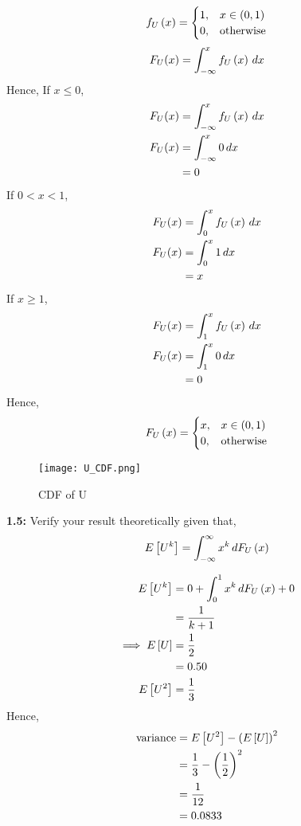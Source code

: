 \documentclass[journal,12pt,two column]{IEEEtran}
\begin{document}
\begin{align}  
f_{U}\left(x\right) = 
\begin{cases}
1, & x\in (0,1) \\
0, & \text{otherwise}
\end{cases}
\end{align}
\begin{equation}
    F_U(x) = \int_{-\infty}^{x} f_{U}\left(x\right) \,dx  \\
\end{equation}
Hence,
If $ x \leq 0 $,
\begin{align}
    F_U(x) &= \int_{-\infty}^{x} f_{U}\left(x\right) \,dx  \\
    F_U(x) &= \int_{-\infty}^{x} 0 \,dx  \\
           &= 0
\end{align}
If $0 <x <1$,
\begin{align}
    F_U(x) &= \int_{0}^{x} f_{U}\left(x\right) \,dx  \\
    F_U(x) &= \int_{0}^{x} 1 \,dx  \\
           &= x
\end{align}
If $x \geq 1$,
\begin{align}
    F_U(x) &= \int_{1}^{x} f_{U}\left(x\right) \,dx  \\
    F_U(x) &= \int_{1}^{x} 0 \,dx  \\
           &= 0
\end{align}
Hence,
\begin{align}  
F_{U}\left(x\right) = 
\begin{cases}
x, & x\in (0,1) \\
0, & \text{otherwise}
\end{cases}
\end{align}
\begin{figure}[!ht]
\texttt{[image: U\_CDF.png]}
\caption{CDF of U}
\label{Fig 1}
\end{figure}   

\textbf{1.5:} Verify your result theoretically given that,
\begin{equation}
    E{}\left[U^k\right] = \int_{-\infty}^{\infty} x^k \,dF_{U}\left(x\right)
\end{equation}

\solution

\begin{align}
    E{}\left[U^k\right] &=  0 + \int_{0}^{1} x^k \,dF_{U}\left(x\right) + 0 \\
                 &= \frac{1}{k + 1}  \\
    \implies E{}\left[U\right] &= \frac{1}{2}\\
                        &= 0.50 \\
             E{}\left[U^2\right] &= \frac{1}{3}
\end{align}
Hence,
\begin{align}
    \text{variance} &= E{}\left[U^2\right] - \left(E{}\left[U\right]\right)^2 \\
                    &= \frac{1}{3} - \left(\frac{1}{2}\right)^2 \\
                    &= \frac{1}{12} \\
                    &= 0.0833
\end{align}
\end{document}
